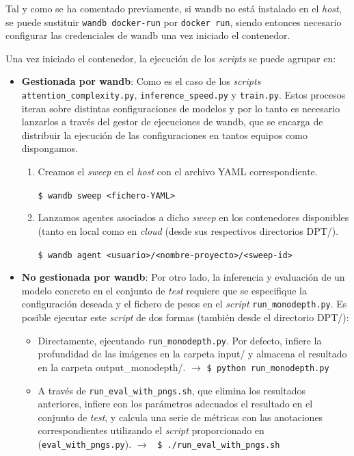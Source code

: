 Tal y como se ha comentado previamente, si wandb no está instalado en el \textit{host}, se puede sustituir \texttt{wandb docker{-}run} por \texttt{docker run}, siendo entonces necesario configurar las credenciales de wandb una vez iniciado el contenedor. 

Una vez iniciado el contenedor, la ejecución de los \textit{scripts} se puede agrupar en:
\begin{itemize}

\item \textbf{Gestionada por wandb}: Como es el caso de los \textit{scripts} \texttt{attention{\_}complexity.py}, \texttt{inference{\_}speed.py} y \texttt{train.py}. Estos procesos iteran sobre distintas configuraciones de modelos y por lo tanto es necesario lanzarlos a través del gestor de ejecuciones de wandb, que se encarga de distribuir la ejecución de las configuraciones en tantos equipos como dispongamos.

\begin{enumerate}

\item Creamos el \textit{sweep} en el \textit{host} con el archivo YAML correspondiente.

\texttt{\$ wandb sweep <fichero{-}YAML>}

\item Lanzamos agentes asociados a dicho \textit{sweep} en los contenedores disponibles (tanto en local como en \textit{cloud} (desde sus respectivos directorios DPT/).

\texttt{\$ wandb agent <usuario>/<nombre{-}proyecto>/<sweep{-}id>}

\end{enumerate}

\item \textbf{No gestionada por wandb}: Por otro lado, la inferencia y evaluación de un modelo concreto en el conjunto de \textit{test} requiere que se especifique la configuración deseada y el fichero de pesos en el \textit{script} \texttt{run{\_}monodepth.py}. Es posible ejecutar este \textit{script} de dos formas (también desde el directorio DPT/):

\begin{itemize}

\item Directamente, ejecutando \texttt{run{\_}monodepth.py}. Por defecto, infiere la profundidad de las imágenes en la carpeta input/ y almacena el resultado en la carpeta output{\_}monodepth/. $\rightarrow$ \texttt{\$ python run{\_}monodepth.py}

\item A través de \texttt{run{\_}eval{\_}with{\_}pngs.sh}, que elimina los resultados anteriores, infiere con los parámetros adecuados el resultado en el conjunto de \textit{test}, y calcula una serie de métricas con las anotaciones correspondientes utilizando el \textit{script} proporcionado en \cite{bts} (\texttt{eval{\_}with{\_}pngs.py}). $\rightarrow$ \texttt{ \$ ./run{\_}eval{\_}with{\_}pngs.sh}

\end{itemize}

\end{itemize}

